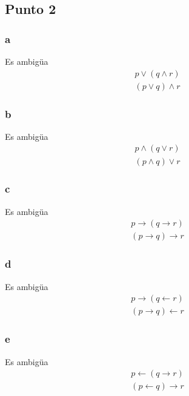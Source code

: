 \documentclass{article}
\begin{document}
\subsection{Punto 2}
\subsubsection{a}
\begin{logicenv}[5]{Es ambigüa}
    \begin{gather*}
        p \lor (q \land r)\\
        (p \lor q) \land r
    \end{gather*}
\end{logicenv}

\subsubsection{b}
\begin{logicenv}[5]{Es ambigüa}
    \begin{gather*}
        p \land (q \lor r)\\
        (p \land q) \lor r
    \end{gather*}
\end{logicenv}

\subsubsection{c}
\begin{logicenv}[5]{Es ambigüa}
    \begin{gather*}
        p \to (q \to r)\\
        (p \to q) \to r
    \end{gather*}
\end{logicenv}

\subsubsection{d}
\begin{logicenv}[5]{Es ambigüa}
    \begin{gather*}
        p \to (q \gets r)\\
        (p \to q) \gets r
    \end{gather*}
\end{logicenv}

\subsubsection{e}
\begin{logicenv}[5]{Es ambigüa}
    \begin{gather*}
        p \gets (q \to r)\\
        (p \gets q) \to r
    \end{gather*}
\end{logicenv}
\end{document}
